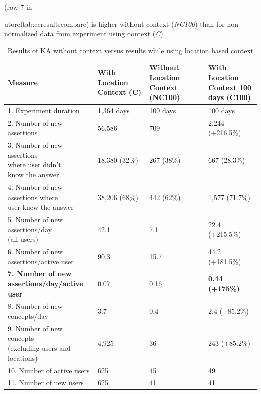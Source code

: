 (row 7 in {utoref{tab:ccresultscompare}) is higher without context 
(\emph{NC100}) than for  non-normalized data from experiment using context 
(\emph{C}).

\begin{table}[h]
\centering
\caption{Results of KA without context versus results while using location based context}
\label{tab:ccresultscompare}
\begin{tabular}{|l|l|l|l|}
	\hline
	\textbf{Measure}  & \makecell[l]{\textbf{With Location}\\\textbf{Context (C)}} & \makecell[l]{\textbf{Without Location}\\ \textbf{Context (NC100)}} &  \makecell[l]{\textbf{With Location}\\\textbf{Context 100}\\\textbf{days (C100)}}\\
    \hline
    1. Experiment duration & 1,364 days & 100 days & 100 days \\
    \hline
    2. Number of new assertions & 56,586 & 709 & 2,244 (+216.5\%) \\
    \hline
    \makecell[l]{3. Number of new assertions\\where user didn't\\ know the answer} & 18,380 (32\%) & 267 (38\%) & 667 (28.3\%) \\
	\hline 
    \makecell[l]{4. Number of new \\assertions where \\user knew the answer}  &38,206 (68\%) & 442 (62\%) & 1,577 (71.7\%) \\
	\hline
    \makecell[l]{5. Number of new \\assertions/day \\(all users) } & 42.1 & 7.1 & 22.4 (+215.5\%)\\
	\hline
    \makecell[l]{6. Number of new \\assertions/active user } & 90.3 & 15.7 & 44.2 (+181.5\%) \\
	\hline
    \makecell[l]{\textbf{7. Number of new}\\\textbf{assertions/day/active}\\\textbf{user}} & 0.07 & 0.16 & \textbf{0.44 (+175\%)} \\
	\hline
    \makecell[l]{8. Number of new \\concepts/day} & 3.7 & 0.4 & 2.4 (+85.2\%) \\
	\hline
    \makecell[l]{9. Number of new concepts \\ (excluding users and\\ locations)} & 4,925 & 36 & 243 (+85.2\%) \\
	\hline
    10. Number of active users & 625 & 45 & 49 \\
	\hline
    11. Number of new users & 625 & 41 & 41 \\
	\hline
\end{tabular}
\end{table}

}
